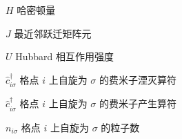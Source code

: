 \begin{denotation}[3cm]
\item[$H$] 哈密顿量
\item[$J$] 最近邻跃迁矩阵元
\item[$U$] Hubbard 相互作用强度
\item[$\hat{c}^{\dagger}_{i\sigma}$] 格点 $i$ 上自旋为 $\sigma$ 的费米子湮灭算符
\item[$\hat{c}^{\dagger}_{i\sigma}$] 格点 $i$ 上自旋为 $\sigma$ 的费米子产生算符
\item[$n_{i\sigma}$] 格点 $i$ 上自旋为 $\sigma$ 的粒子数
\end{denotation}





